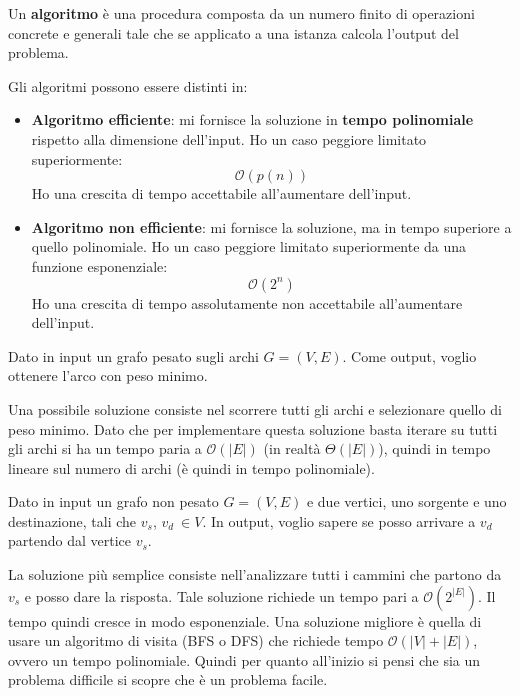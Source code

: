 \begin{definizione} 
    Un \textbf{algoritmo} è una procedura composta da un numero finito di
    operazioni concrete e generali tale che se applicato a una istanza calcola
    l'output del problema.

    Gli algoritmi possono essere distinti in:
    \begin{itemize}
        \item \textbf{Algoritmo efficiente}: mi fornisce la soluzione in
              \textbf{tempo polinomiale} rispetto alla dimensione dell'input. Ho
              un caso peggiore limitato superiormente:
              \begin{equation}
                  \mathcal{O}(p(n))
              \end{equation}
              Ho una crescita di tempo accettabile all'aumentare dell'input.
        \item \textbf{Algoritmo non efficiente}: mi fornisce la soluzione, ma in
              tempo superiore a quello polinomiale. Ho un caso peggiore limitato
              superiormente da una funzione esponenziale:
              \begin{equation}
                  \mathcal{O}(2^n)
              \end{equation}
              Ho una crescita di tempo assolutamente non accettabile all'aumentare
              dell'input.
    \end{itemize}
\end{definizione}
\begin{esempio} 
    Dato in input un grafo pesato sugli archi $G = (V,E)$. Come output, voglio
    ottenere l'arco con peso minimo.

    Una possibile soluzione consiste nel scorrere tutti gli archi e selezionare
    quello di peso minimo. Dato che per implementare questa soluzione basta
    iterare su tutti gli archi si ha un tempo paria a $\mathcal{O}(|E|)$ (in
    realtà $\Theta(|E|)$), quindi in tempo lineare sul numero di archi (è quindi
    in tempo polinomiale).
\end{esempio}
\begin{esempio} 
    Dato in input un grafo non pesato $G = (V, E)$ e due vertici, uno sorgente e
    uno destinazione, tali che $v_s$, $v_d \ \in V$. In output, voglio sapere se
    posso arrivare a $v_d$ partendo dal vertice $v_s$.

    La soluzione più semplice consiste nell'analizzare tutti i cammini che partono
    da $v_s$ e posso dare la risposta. Tale soluzione richiede un tempo pari a
    $\mathcal{O}(2^{|E|})$. Il tempo quindi cresce in modo esponenziale. Una
    soluzione migliore è quella di usare un algoritmo di visita (BFS o DFS) che
    richiede tempo $\mathcal{O}(|V | + |E|)$, ovvero un tempo polinomiale. Quindi
    per quanto all'inizio si pensi che sia un problema difficile si scopre che è
    un problema facile.
\end{esempio}
